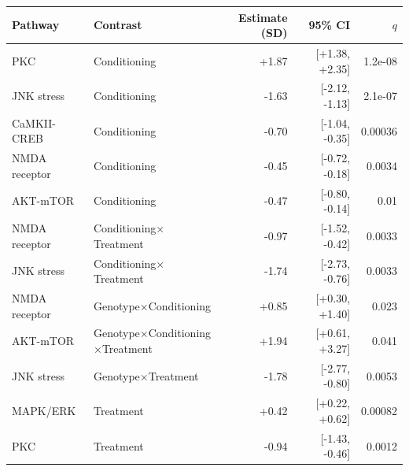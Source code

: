 \begin{tabular}{llrrr}
\toprule
Pathway & Contrast & Estimate (SD) & 95\% CI & $q$ \\
\midrule
PKC & Conditioning & +1.87 & [+1.38, +2.35] & 1.2e-08 \\
JNK stress & Conditioning & -1.63 & [-2.12, -1.13] & 2.1e-07 \\
CaMKII-CREB & Conditioning & -0.70 & [-1.04, -0.35] & 0.00036 \\
NMDA receptor & Conditioning & -0.45 & [-0.72, -0.18] & 0.0034 \\
AKT-mTOR & Conditioning & -0.47 & [-0.80, -0.14] & 0.01 \\
NMDA receptor & Conditioning$\times$Treatment & -0.97 & [-1.52, -0.42] & 0.0033 \\
JNK stress & Conditioning$\times$Treatment & -1.74 & [-2.73, -0.76] & 0.0033 \\
NMDA receptor & Genotype$\times$Conditioning & +0.85 & [+0.30, +1.40] & 0.023 \\
AKT-mTOR & Genotype$\times$Conditioning$\times$Treatment & +1.94 & [+0.61, +3.27] & 0.041 \\
JNK stress & Genotype$\times$Treatment & -1.78 & [-2.77, -0.80] & 0.0053 \\
MAPK/ERK & Treatment & +0.42 & [+0.22, +0.62] & 0.00082 \\
PKC & Treatment & -0.94 & [-1.43, -0.46] & 0.0012 \\
\bottomrule
\end{tabular}
\par{}
